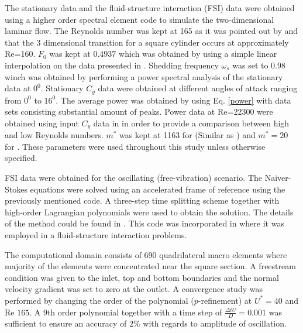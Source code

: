 The stationary data and the fluid-structure interaction (FSI) data were obtained using a higher order spectral element code to simulate the two-dimensional laminar flow. The Reynolds number was kept at 165 as it was pointed out by \cite{Sheard2009} and \cite{Tong2008} that the 3 dimensional transition for a square cylinder occurs at approximately Re=160. $F_0$ was kept at $0.4937$ which was obtained by using a simple linear interpolation on the data presented in \cite{Joly2012}. Shedding frequency $\omega_s$ was set to $0.98$ winch was obtained by performing a power spectral analysis of the stationary data at $0^0$. Stationary $C_y$ data were obtained at different angles of attack ranging from $0^0$ to $16^0$. The average power was obtained by using Eq. \eqref{power} with data sets consisting substantial amount of peaks. Power data  at Re=22300 were obtained using input $C_y$ data in \cite{Parkinson1964} in order to provide a comparison between high and low Reynolds numbers. $m^*$ was kept at 1163 for  (Similar as \cite{Parkinson1964}) and $m^*=20$ for . These parameters  were used throughout this study unless otherwise specified. 


 FSI data were obtained for the oscillating (free-vibration) scenario. The Naiver-Stokes equations were solved using an accelerated frame of reference using the previously mentioned code. A three-step time splitting scheme together with high-order Lagrangian polynomials were used to obtain the solution. The details of the method could be found in \cite{Thompson2006,Thompson1996a}. This code was incorporated in \cite{Leontini2011,Leontini2007a}  where it was employed in a fluid-structure interaction problems. 
 
 The computational domain consists of 690 quadrilateral macro elements where majority of the elements were concentrated near the square section. A freestream condition was given to the inlet, top and bottom boundaries and the normal velocity gradient was set to zero at the outlet. A convergence study was performed by changing the order of the polynomial ($p$-refinement) at $U^*=40$ and Re $165$. A 9th order polynomial together with a time step of $\frac{\Delta tU}{D}=0.001$ was sufficient to ensure an accuracy of $2\%$ with regards to amplitude of oscillation.  
 

 
 
 

 
 
 
 










